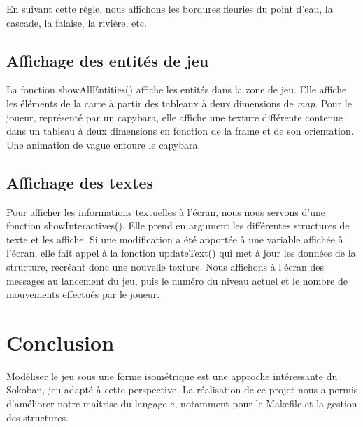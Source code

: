 \documentclass[french, 12pt]{article}
\begin{document}
    En suivant cette règle, nous affichons les bordures fleuries du point d'eau, la cascade, la falaise, la rivière, etc.

    \subsection{Affichage des entités de jeu}

    La fonction showAllEntities() affiche les entités dans la zone de jeu.
    Elle affiche les éléments de la carte à partir des tableaux à deux dimensions de \textit{map}.
    Pour le joueur, représenté par un capybara, elle affiche une texture différente contenue dans un tableau à deux dimensions en fonction de la frame et de son orientation. Une animation de vague entoure le capybara.

    \subsection{Affichage des textes}

    Pour afficher les informations textuelles à l'écran, nous nous servons d'une fonction showInteractives(). Elle prend en argument les différentes structures de texte et les affiche. Si une modification a été apportée à une variable affichée à l'écran, elle fait appel à la fonction updateText() qui met à jour les données de la structure, recréant donc une nouvelle texture.
    Nous affichons à l'écran des messages au lancement du jeu, puis le numéro du niveau actuel et le nombre de mouvements effectués par le joueur.

\section{Conclusion}

Modéliser le jeu sous une forme isométrique est une approche intéressante du Sokoban, jeu adapté à cette perspective. La réalisation de ce projet nous a permis d'améliorer notre maîtrise du langage c, notamment pour le Makefile et la gestion des structures.
\end{document}
